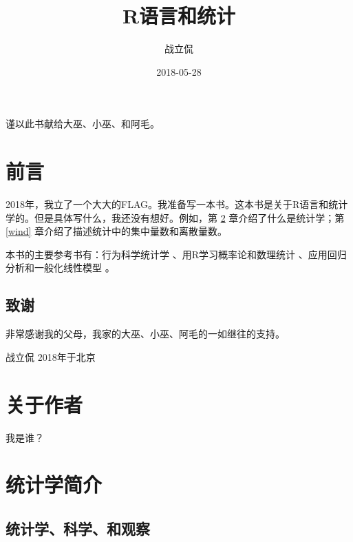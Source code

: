 \documentclass[]{ctexbook}
\title{R语言和统计}
\author{战立侃}
\date{2018-05-28}
\let\BeginKnitrBlock\begin \let\EndKnitrBlock\end
\begin{document}
\maketitle


\thispagestyle{empty}

\begin{center}
谨以此书献给大巫、小巫、和阿毛。
\end{center}

\setlength{\abovedisplayskip}{-5pt}
\setlength{\abovedisplayshortskip}{-5pt}

{
\setcounter{tocdepth}{2}
\tableofcontents
}
\listoftables
\listoffigures
\chapter*{前言}


2018年，我立了一个大大的FLAG。我准备写一本书。这本书是关于R语言和统计学的。但是具体写什么，我还没有想好。例如，第
\ref{Introduction-to-Statistics} 章介绍了什么是统计学；第 \ref{wind}
章介绍了描述统计中的集中量数和离散量数。

本书的主要参考书有：行为科学统计学
\citep{RN154}、用R学习概率论和数理统计
\citep{RN261}、应用回归分析和一般化线性模型 \citep{RN146}。

\section*{致谢}


非常感谢我的父母，我家的大巫、小巫、阿毛的一如继往的支持。

\BeginKnitrBlock{flushright}
战立侃 2018年于北京
\EndKnitrBlock{flushright}

\hypertarget{author.unnumbered}{%
\chapter{关于作者}\label{author.unnumbered}}

我是谁？

\mainmatter

\hypertarget{Introduction-to-Statistics}{%
\chapter{统计学简介}\label{Introduction-to-Statistics}}

\section{统计学、科学、和观察}
\end{document}
